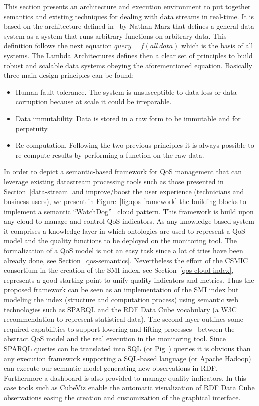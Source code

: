 This section presents an architecture and execution environment to put together 
semantics and existing techniques for dealing with data streams in real-time. 
It is based on the architecture defined in~\cite{BigDataManing} by Nathan Marz that defines 
a general data system as a system that runs arbitrary functions on arbitrary data. This definition 
follows the next equation $query=f(all\,data)$ which is the basis of all systems. The Lambda 
Architectures defines then a clear set of principles to build robust and scalable data 
systems obeying the aforementioned equation. Basically three main design principles 
can be found:
\begin{itemize}
 \item Human fault-tolerance. The system is unsusceptible to data loss or data corruption because at scale it could be irreparable.
 \item Data immutability. Data is stored in a raw form to be immutable and for perpetuity.
 \item Re-computation. Following the two previous principles it is always possible 
 to re-compute results by performing a function on the raw data.
\end{itemize}

In order to depict a semantic-based framework for QoS management that can leverage existing datastream processing 
tools such as those presented in Section~\ref{data-stream} and improve/boost the user experience (technicians and business users), 
we present in Figure~\ref{fig:qos-framework} the building blocks to implement a semantic ``WatchDog''~\cite{watchdog} cloud pattern. This framework is build 
upon any cloud to manage and control QoS indicators. As any knowledge-based system it comprises a knowledge layer in which 
ontologies are used to represent a QoS model and the quality functions to be deployed on the monitoring tool. The formalization of a 
QoS model is not an easy task since a lot of tries have been already done, see Section~\ref{qos-semantics}. Nevertheless the 
effort of the CSMIC consortium in the creation of the SMI index, see Section~\ref{qos-cloud-index}, represents a good starting point to unify quality indicators 
and metrics. Thus the proposed framework can be seen as an implementation of the SMI index but modeling the index (structure and computation process) 
using semantic web technologies such as SPARQL and the RDF Data Cube vocabulary (a W3C recommendation to represent statistical data). 
The second layer outlines some required capabilities to support lowering and lifting processes~\cite{DBLP:journals/jucs/RodriguezRMPGP12} 
between the abstract QoS model and the real execution in the monitoring tool. Since SPARQL queries can be translated into SQL (or Pig~\cite{Schatzle:2011:PMS:1999299.1999303}) queries 
it is obvious than any execution framework supporting a SQL-based language (or Apache Hadoop) can execute our semantic model generating new observations in RDF. Furthermore a dashboard is also provided to manage quality indicators. In this case 
tools such as CubeViz enable the automatic visualization of RDF Data Cube observations easing the creation and customization of the graphical interface.

